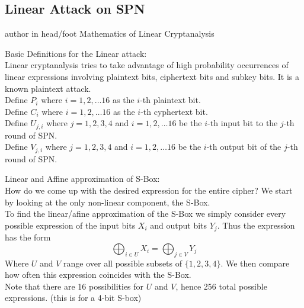 \documentclass[9pt]{beamer}
\begin{document}
\subsection{Linear Attack on SPN}
\begin{frame}
\begin{beamercolorbox}[ht=2.5ex,dp=1.125ex,center,rounded=true,shadow=true]{author in head/foot}
Mathematics of Linear Cryptanalysis
\end{beamercolorbox}
\end{frame}

\begin{frame}
\large{Basic Definitions for the Linear attack:}\\
\vspace{5 mm}
Linear cryptanalysis tries to take advantage of high probability occurrences of linear expressions involving plaintext bits, ciphertext bits and subkey bits. It is a known plaintext attack.\\
\vspace{5 mm}
Define $P_i$ where $i = 1, 2, \dots 16$ as the $i$-th plaintext bit.\\
Define $C_i$ where $i = 1, 2, \dots 16$ as the $i$-th cyphertext bit.\\
Define $U_{j,i}$ where $j = 1, 2, 3, 4$ and $i = 1, 2, \dots 16$ be the $i$-th input bit to the $j$-th round of SPN.\\
Define $V_{j,i}$ where $j = 1, 2, 3, 4$ and $i = 1, 2, \dots 16$ be the $i$-th output bit of the $j$-th round of SPN.\\
\end{frame}

\begin{frame}
Linear and Affine approximation of S-Box:\\
\vspace{5mm}
How do we come up with the desired expression for the entire cipher? We start by looking at the only non-linear component, the S-Box.\\
\vspace{5mm}
To find the linear/afine approximation of the S-Box we simply consider every possible expression of the input bits $X_i$ and output bits $Y_j$. Thus the expression has the form
\[ \bigoplus_{i \in U} X_i = \bigoplus_{j \in V} Y_j \]
Where $U$ and $V$ range over all possible subsets of $\{1, 2, 3 ,4\}$. We then compare how often this expression coincides with the S-Box. \\
\vspace{5mm}
Note that there are 16 possibilities for $U$ and $V$, hence 256 total possible expressions. (this is for a 4-bit S-box)
\end{frame}
\end{document}
